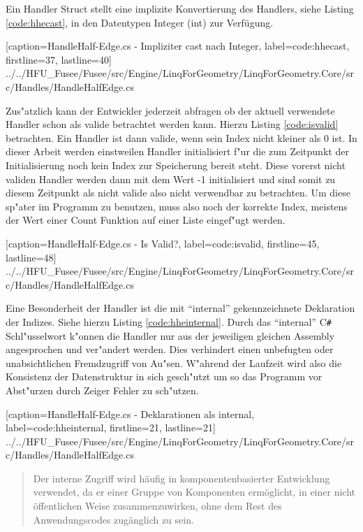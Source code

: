 \documentclass[pagesize, paper=a4, fontsize=12pt,titlepage=true, headings=small, headnosepline, abstractoff, liststotoc, nochapterprefix, plainheadsepline]{scrreprt}
\newcommand{\CSS}{C\texttt{\# }}
\begin{document}
Ein Handler Struct stellt eine implizite Konvertierung des Handlers, siehe Listing \ref{code:hhecast}, in den Datentypen Integer (int) zur Verfügung.

			[caption={HandleHalf-Edge.cs - Impliziter cast nach Integer}, label=code:hhecast, firstline=37, lastline=40]
			{../../HFU_Fusee/Fusee/src/Engine/LinqForGeometry/LinqForGeometry.Core/src/Handles/HandleHalfEdge.cs}

Zus"atzlich kann der Entwickler jederzeit abfragen ob der aktuell verwendete Handler schon als valide betrachtet werden kann. Hierzu Listing \ref{code:isvalid} betrachten. Ein Handler ist dann valide, wenn sein Index nicht kleiner als 0 ist. In dieser Arbeit werden einstweilen Handler initialisiert f"ur die zum Zeitpunkt der Initialisierung noch kein Index zur Speicherung bereit steht. Diese vorerst nicht validen Handler werden dann mit dem Wert -1 initialisiert und sind somit zu diesem Zeitpunkt als nicht valide also nicht verwendbar zu betrachten. Um diese sp"ater im Programm zu benutzen, muss also noch der korrekte Index, meistens der Wert einer Count Funktion auf einer Liste eingef"ugt werden.

			[caption={HandleHalf-Edge.cs - Is Valid?}, label=code:isvalid, firstline=45, lastline=48]
			{../../HFU_Fusee/Fusee/src/Engine/LinqForGeometry/LinqForGeometry.Core/src/Handles/HandleHalfEdge.cs}

Eine Besonderheit der Handler ist die mit "`internal"' gekennzeichnete Deklaration der Indizes. Siehe hierzu Listing \ref{code:hheinternal}. Durch das "`internal"' \CSS Schl"usselwort k"onnen die Handler nur aus der jeweiligen gleichen Assembly angesprochen und ver"andert werden. Dies verhindert einen unbefugten oder unabsichtlichen Fremdzugriff von Au"sen. W"ahrend der Laufzeit wird also die Konsistenz der Datenstruktur in sich gesch"utzt um so das Programm vor Abst"urzen durch Zeiger Fehler zu sch"utzen.

			[caption={HandleHalf-Edge.cs - Deklarationen als internal}, label=code:hheinternal, firstline=21, lastline=21]
			{../../HFU_Fusee/Fusee/src/Engine/LinqForGeometry/LinqForGeometry.Core/src/Handles/HandleHalfEdge.cs}

\begin{quote}{\dq}Der interne Zugriff wird h{\"a}ufig in komponentenbasierter Entwicklung verwendet, da er einer Gruppe von Komponenten erm{\"o}glicht, in einer nicht {\"o}ffentlichen Weise zusammenzuwirken, ohne dem Rest des Anwendungscodes zug{\"a}nglich zu sein.{\dq} \cite{MicrosoftCReferenz.2013}\end{quote}
\end{document}
